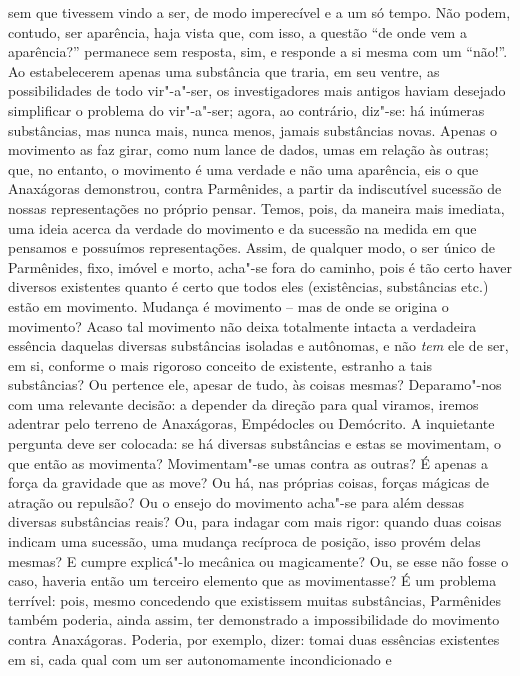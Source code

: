 sem que tivessem vindo a ser, de modo imperecível e a um só tempo. Não
podem, contudo, ser aparência, haja vista que, com isso, a questão ``de
onde vem a aparência?'' permanece sem resposta, sim, e responde a si 
mesma com um ``não!''. Ao estabelecerem apenas uma substância
que traria, em seu ventre, as possibilidades de todo vir"-a"-ser, os
investigadores mais antigos haviam desejado simplificar o problema do
vir"-a"-ser; agora, ao contrário, diz"-se: há inúmeras substâncias, mas
nunca mais, nunca menos, jamais substâncias novas. Apenas o movimento
as faz girar, como num lance de dados, umas em relação às outras; que,
no entanto, o movimento é uma verdade e não uma aparência, eis o que
Anaxágoras demonstrou, contra Parmênides, a partir da indiscutível
sucessão de nossas representações no próprio pensar. Temos, pois, da
maneira mais imediata, uma ideia acerca da verdade do movimento e da
sucessão na medida em que pensamos e possuímos representações. Assim,
de qualquer modo, o ser único de Parmênides, fixo, imóvel e morto,
acha"-se fora do caminho, pois é tão certo haver diversos
existentes quanto é certo que todos eles (existências, substâncias
etc.) estão em movimento. Mudança é movimento -- mas de onde se origina
o movimento? Acaso tal movimento não deixa totalmente intacta a
verdadeira essência daquelas diversas substâncias isoladas e autônomas,
e não \textit{tem} ele de ser, em si, conforme o mais rigoroso conceito
de existente, estranho a tais substâncias? Ou pertence ele, apesar de
tudo, às coisas mesmas? Deparamo"-nos com uma relevante decisão: a
depender da direção para qual viramos, iremos adentrar pelo terreno de
Anaxágoras, Empédocles ou Demócrito. A inquietante pergunta
deve ser colocada: se há diversas substâncias e estas se movimentam, o
que então as movimenta? Movimentam"-se umas contra as outras? É apenas a
força da gravidade que as move? Ou há, nas próprias coisas, forças
mágicas de atração ou repulsão? Ou o ensejo do movimento acha"-se para
além dessas diversas substâncias reais? Ou, para indagar com mais
rigor: quando duas coisas indicam uma sucessão, uma mudança recíproca
de posição, isso provém delas mesmas? E cumpre explicá"-lo mecânica ou
magicamente? Ou, se esse não fosse o caso, haveria então um terceiro
elemento que as movimentasse? É um problema terrível: pois, mesmo
concedendo que existissem muitas substâncias, Parmênides também
poderia, ainda assim, ter demonstrado a impossibilidade do movimento
contra Anaxágoras. Poderia, por exemplo, dizer: tomai duas essências
existentes em si, cada qual com um ser autonomamente incondicionado e
